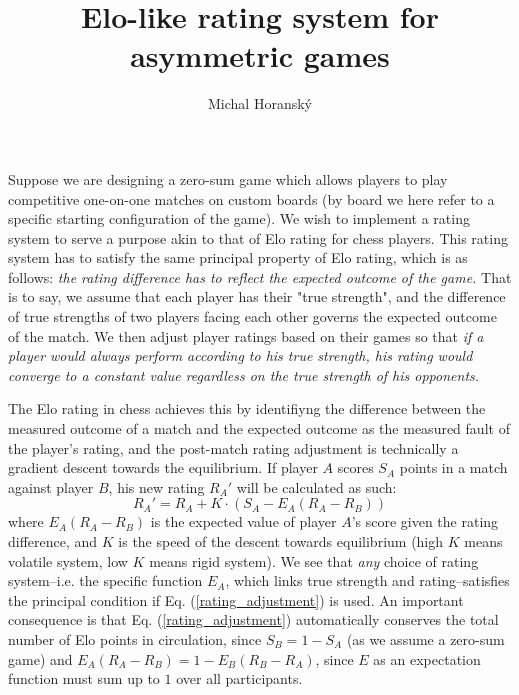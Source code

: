 \documentclass[12pt]{article}
\begin{document}
	\title{Elo-like rating system for asymmetric games}
	\author{Michal Horanský}
	\maketitle
	
	Suppose we are designing a zero-sum game which allows players to play competitive one-on-one matches on custom boards (by board we here refer to a specific starting configuration of the game). We wish to implement a rating system to serve a purpose akin to that of Elo rating for chess players. This rating system has to satisfy the same principal property of Elo rating, which is as follows: \textit{the rating difference has to reflect the expected outcome of the game.} That is to say, we assume that each player has their "true strength", and the difference of true strengths of two players facing each other governs the expected outcome of the match. We then adjust player ratings based on their games so that \textit{if a player would always perform according to his true strength, his rating would converge to a constant value regardless on the true strength of his opponents.}
	
	The Elo rating in chess achieves this by identifiyng the difference between the measured outcome of a match and the expected outcome as the measured fault of the player's rating, and the post-match rating adjustment is technically a gradient descent towards the equilibrium. If player $A$ scores $S_A$ points in a match against player $B$, his new rating $R_A'$ will be calculated as such:
	\begin{equation} \label{rating_adjustment}		
	R_A' = R_A + K\cdot \left(S_A - E_A(R_A - R_B)\right)
	\end{equation}
where $E_A(R_A - R_B)$ is the expected value of player $A$'s score given the rating difference, and $K$ is the speed of the descent towards equilibrium (high $K$ means volatile system, low $K$ means rigid system). We see that \textit{any} choice of rating system--i.e. the specific function $E_A$, which links true strength and rating--satisfies the principal condition if Eq. (\ref{rating_adjustment}) is used. An important consequence is that Eq. (\ref{rating_adjustment}) automatically conserves the total number of Elo points in circulation, since $S_B = 1 - S_A$ (as we assume a zero-sum game) and $E_A(R_A - R_B) = 1 - E_B(R_B - R_A)$, since $E$ as an expectation function must sum up to $1$ over all participants.
\end{document}
